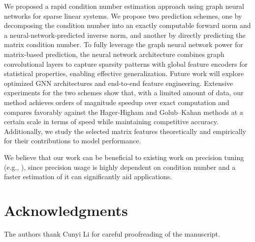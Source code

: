\documentclass[11pt,a4paper]{article}
\theoremstyle{plain}
\theoremstyle{definition}
\theoremstyle{remark}
\begin{document}
We proposed a rapid condition number estimation approach using graph neural networks for sparse linear systems. We propose two prediction schemes, one by decomposing the condition number into an exactly computable forward norm and a neural-network-predicted inverse norm, and another by directly predicting the matrix condition number. To fully leverage the graph neural network power for matrix-based prediction, the neural network architecture combines graph convolutional layers to capture sparsity patterns with global feature encoders for statistical properties, enabling effective generalization. Future work will explore optimized GNN architectures and end-to-end feature engineering.  Extensive experiments for the two schemes show that, with a limited amount of data, our method achieves orders of magnitude speedup over exact computation and compares favorably against the Hager-Higham and Golub–Kahan methods at a certain scale in terms of speed while maintaining competitive accuracy. Additionally, we study the selected matrix features theoretically and empirically for their contributions to model performance.  

We believe that our work can be beneficial to existing work on precision tuning (e.g., \cite{car26pre}), since precision usage is highly dependent on condition number and a faster estimation of it can significantly aid applications. 




\section*{Acknowledgments}

The authors thank Cunyi Li for careful proofreading of the manuscript.



\end{document}
